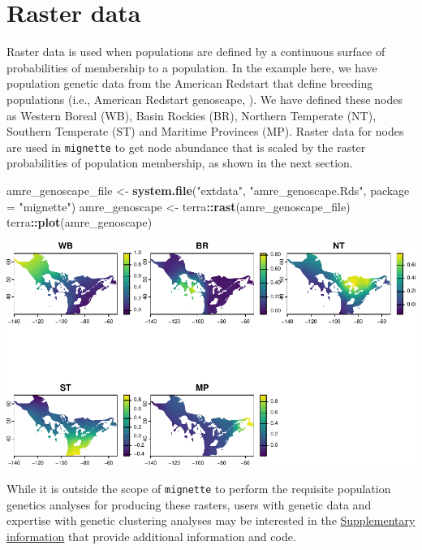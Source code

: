 \documentclass[
]{book}
\newenvironment{Shaded}{\begin{snugshade}}{\end{snugshade}}
\newcommand{\AttributeTok}[1]{\textcolor[rgb]{0.13,0.29,0.53}{#1}}
\newcommand{\FunctionTok}[1]{\textcolor[rgb]{0.13,0.29,0.53}{\textbf{#1}}}
\newcommand{\NormalTok}[1]{#1}
\newcommand{\OtherTok}[1]{\textcolor[rgb]{0.56,0.35,0.01}{#1}}
\newcommand{\SpecialCharTok}[1]{\textcolor[rgb]{0.81,0.36,0.00}{\textbf{#1}}}
\newcommand{\StringTok}[1]{\textcolor[rgb]{0.31,0.60,0.02}{#1}}
\begin{document}
\hypertarget{raster-data}{%
\section{Raster data}\label{raster-data}}

Raster data is used when populations are defined by a continuous surface of probabilities of membership to a population. In the example here, we have population genetic data from the American Redstart that define breeding populations (i.e., American Redstart genoscape, \citep{desaix2023low}). We have defined these nodes as Western Boreal (WB), Basin Rockies (BR), Northern Temperate (NT), Southern Temperate (ST) and Maritime Provinces (MP). Raster data for nodes are used in \texttt{mignette} to get node abundance that is scaled by the raster probabilities of population membership, as shown in the next section.

\begin{Shaded}
\begin{Highlighting}[]
\NormalTok{amre\_genoscape\_file }\OtherTok{\textless{}{-}} \FunctionTok{system.file}\NormalTok{(}\StringTok{"extdata"}\NormalTok{, }\StringTok{"amre\_genoscape.Rds"}\NormalTok{, }\AttributeTok{package =} \StringTok{"mignette"}\NormalTok{)}
\NormalTok{amre\_genoscape }\OtherTok{\textless{}{-}}\NormalTok{ terra}\SpecialCharTok{::}\FunctionTok{rast}\NormalTok{(amre\_genoscape\_file)}
\NormalTok{terra}\SpecialCharTok{::}\FunctionTok{plot}\NormalTok{(amre\_genoscape)}
\end{Highlighting}
\end{Shaded}

\includegraphics{Mignette_files/figure-latex/unnamed-chunk-15-1.pdf}

While it is outside the scope of \texttt{mignette} to perform the requisite population genetics analyses for producing these rasters, users with genetic data and expertise with genetic clustering analyses may be interested in the \protect\hyperlink{supplemental}{Supplementary information} that provide additional information and code.
\end{document}
